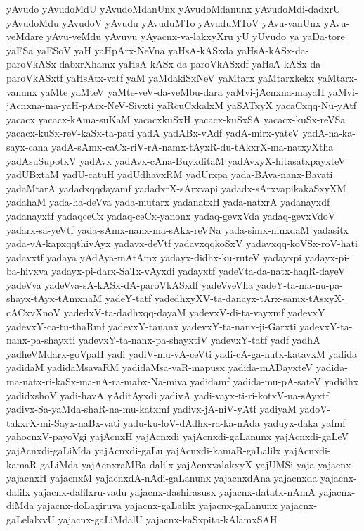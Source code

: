 {yAvudo
yAvudoMdU
yAvudoMdanUnx
yAvudoMdanunx
yAvudoMdi-dadxrU
yAvudoMdu
yAvudoV
yAvudu
yAvuduMTo
yAvuduMToV
yAvu-vanUnx
yAvu-veMdare
yAvu-veMdu
yAvuvu
yAyacnx-va-lakxyXru
yU
yUvudo
ya
yaDa-tore
yaESa
yaESoV
yaH
yaHpArx-NeVna
yaHsA-kASxda
yaHsA-kASx-da-paroVkASx-dabxrXhamx
yaHsA-kASx-da-paroVkASxdf
yaHsA-kASx-da-paroVkASxtf
yaHsAtx-vatf
yaM
yaMdakiSxNeV
yaMtarx
yaMtarxkekx
yaMtarx-vanunx
yaMte
yaMteV
yaMte-veV-da-veMbu-dara
yaMvi-jAcnxna-mayaH
yaMvi-jAcnxna-ma-yaH-pArx-NeV-Sivxti
yaRcuCxkalxM
yaSATxyX
yacaCxqq-Nu-yAtf
yacacx
yacacx-kAma-suKaM
yacacxkuSxH
yacacx-kuSxSA
yacacx-kuSx-reVSa
yacacx-kuSx-reV-kaSx-ta-pati
yadA
yadABx-vAdf
yadA-mirx-yateV
yadA-na-ka-sayx-cana
yadA-sAmx-caCx-riV-rA-namx-tAyxR-du-tAkxrX-ma-natxyXtha
yadAsuSupotxV
yadAvx
yadAvx-cAna-BuyxditaM
yadAvxyX-hitasatxpayxteV
yadUBxtaM
yadU-catuH
yadUdhavxRM
yadUrxpa
yada-BAva-nanx-Bavati
yadaMtarA
yadadxqqdayamf
yadadxrX-sArxvapi
yadadx-sArxvapikakaSxyXM
yadahaM
yada-ha-deVva
yada-mutarx
yadanatxH
yada-natxrA
yadanayxdf
yadanayxtf
yadaqceCx
yadaq-ceCx-yanonx
yadaq-gevxVda
yadaq-gevxVdoV
yadarx-sa-yeVtf
yada-sAmx-nanx-ma-sAkx-reVNa
yada-simx-ninxdaM
yadasitx
yada-vA-kapxqqthivAyx
yadavx-deVtf
yadavxqqkoSxV
yadavxqq-koVSx-roV-hati
yadavxtf
yadaya
yAdAya-mAtAmx
yadayx-didhx-ku-ruteV
yadayxpi
yadayx-pi-ba-hivxva
yadayx-pi-darx-SaTx-vAyxdi
yadayxtf
yadeVta-da-natx-haqR-dayeV
yadeVva
yadeVva-sA-kASx-dA-paroVkASxdf
yadeVveVha
yadeY-ta-ma-nu-pa-shayx-tAyx-tAmxnaM
yadeY-tatf
yadedhxyXV-ta-danayx-tArx-samx-tAsxyX-cACxvXnoV
yadedxV-ta-dadhxqq-dayaM
yadevxV-di-ta-vayxmf
yadevxY
yadevxY-ca-tu-thaRmf
yadevxY-tananx
yadevxY-ta-nanx-ji-Garxti
yadevxY-ta-nanx-pa-shayxti
yadevxY-ta-nanx-pa-shayxtiV
yadevxY-tatf
yadf
yadhA
yadheVMdarx-goVpaH
yadi
yadiV-mu-vA-ceVti
yadi-cA-ga-nutx-katavxM
yadida
yadidaM
yadidaMsavaRM
yadidaMsa-vaR-mapusx
yadida-mADayxteV
yadida-ma-natx-ri-kaSx-ma-nA-ra-mabx-Na-miva
yadidamf
yadida-mu-pA-sateV
yadidhx
yadidxshoV
yadi-havA
yAditAyxdi
yadivA
yadi-vayx-ti-ri-kotxV-na-sAyxtf
yadivx-Sa-yaMda-shaR-na-mu-katxmf
yadivx-jA-niV-yAtf
yadiyaM
yadoV-takxrX-mi-Sayx-naBx-vati
yadu-ku-loV-dAdhx-ra-ka-nAda
yaduyx-daka
yafmf
yahocnxV-payoVgi
yajAcnxH
yajAcnxdi
yajAcnxdi-gaLanunx
yajAcnxdi-gaLeV
yajAcnxdi-gaLiMda
yajAcnxdi-gaLu
yajAcnxdi-kamaR-gaLalilx
yajAcnxdi-kamaR-gaLiMda
yajAcnxraMBa-dalilx
yajAcnxvalakxyX
yajUMSi
yaja
yajacnx
yajacnxH
yajacnxM
yajacnxdA-nAdi-gaLanunx
yajacnxdAna
yajacnxda
yajacnx-dalilx
yajacnx-dalilxru-vadu
yajacnx-dashirasusx
yajacnx-datatx-nAmA
yajacnx-diMda
yajacnx-doLagiruva
yajacnx-gaLalilx
yajacnx-gaLanunx
yajacnx-gaLelalxvU
yajacnx-gaLiMdalU
yajacnx-kaSxpita-kAlamxSAH
}
